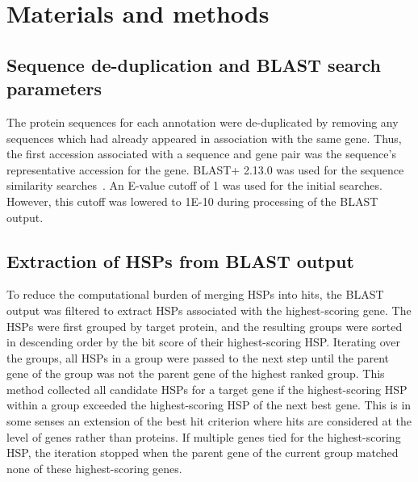 \section{Materials and methods}
\subsection{Sequence de-duplication and BLAST search parameters}
The protein sequences for each annotation were de-duplicated by removing any sequences which had already appeared in association with the same gene. Thus, the first accession associated with a sequence and gene pair was the sequence’s representative accession for the gene. BLAST+ 2.13.0 was used for the sequence similarity searches~\cite{Camacho2009}. An E-value cutoff of 1 was used for the initial searches. However, this cutoff was lowered to 1E-10 during processing of the BLAST output.

\subsection{Extraction of HSPs from BLAST output}
To reduce the computational burden of merging HSPs into hits, the BLAST output was filtered to extract HSPs associated with the highest-scoring gene. The HSPs were first grouped by target protein, and the resulting groups were sorted in descending order by the bit score of their highest-scoring HSP. Iterating over the groups, all HSPs in a group were passed to the next step until the parent gene of the group was not the parent gene of the highest ranked group. This method collected all candidate HSPs for a target gene if the highest-scoring HSP within a group exceeded the highest-scoring HSP of the next best gene. This is in some senses an extension of the best hit criterion where hits are considered at the level of genes rather than proteins. If multiple genes tied for the highest-scoring HSP, the iteration stopped when the parent gene of the current group matched none of these highest-scoring genes.

